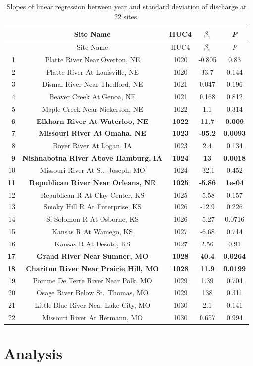\documentclass[12pt,]{article}
\begin{document}
\begin{longtable}[]{@{}rcccc@{}}
\caption{\label{tab:vartab} Slopes of linear regression between year and
standard deviation of discharge at 22 sites.}\tabularnewline
\toprule
~ & Site Name & HUC4 & \(\beta_1\) & \emph{P}\tabularnewline
\midrule
\endfirsthead
\toprule
~ & Site Name & HUC4 & \(\beta_1\) & \emph{P}\tabularnewline
\midrule
\endhead
1 & Platte River Near Overton, NE & 1020 & -0.805 & 0.83\tabularnewline
2 & Platte River At Louisville, NE & 1020 & 33.7 & 0.144\tabularnewline
3 & Dismal River Near Thedford, NE & 1021 & 0.047 & 0.196\tabularnewline
4 & Beaver Creek At Genoa, NE & 1021 & 0.168 & 0.812\tabularnewline
5 & Maple Creek Near Nickerson, NE & 1022 & 1.1 & 0.314\tabularnewline
\textbf{6} & \textbf{Elkhorn River At Waterloo, NE} & \textbf{1022} &
\textbf{11.7} & \textbf{0.009}\tabularnewline
\textbf{7} & \textbf{Missouri River At Omaha, NE} & \textbf{1023} &
\textbf{-95.2} & \textbf{0.0093}\tabularnewline
8 & Boyer River At Logan, IA & 1023 & 2.4 & 0.134\tabularnewline
\textbf{9} & \textbf{Nishnabotna River Above Hamburg, IA} &
\textbf{1024} & \textbf{13} & \textbf{0.0018}\tabularnewline
10 & Missouri River At St.~Joseph, MO & 1024 & -32.1 &
0.452\tabularnewline
\textbf{11} & \textbf{Republican River Near Orleans, NE} & \textbf{1025}
& \textbf{-5.86} & \textbf{1e-04}\tabularnewline
12 & Republican R At Clay Center, KS & 1025 & -5.58 &
0.157\tabularnewline
13 & Smoky Hill R At Enterprise, KS & 1026 & -12.9 &
0.226\tabularnewline
14 & Sf Solomon R At Osborne, KS & 1026 & -5.27 & 0.0716\tabularnewline
15 & Kansas R At Wamego, KS & 1027 & -6.68 & 0.714\tabularnewline
16 & Kansas R At Desoto, KS & 1027 & 2.56 & 0.91\tabularnewline
\textbf{17} & \textbf{Grand River Near Sumner, MO} & \textbf{1028} &
\textbf{40.4} & \textbf{0.0264}\tabularnewline
\textbf{18} & \textbf{Chariton River Near Prairie Hill, MO} &
\textbf{1028} & \textbf{11.9} & \textbf{0.0199}\tabularnewline
19 & Pomme De Terre River Near Polk, MO & 1029 & 1.39 &
0.704\tabularnewline
20 & Osage River Below St.~Thomas, MO & 1029 & 138 &
0.311\tabularnewline
21 & Little Blue River Near Lake City, MO & 1030 & 2.1 &
0.141\tabularnewline
22 & Missouri River At Hermann, MO & 1030 & 0.657 & 0.994\tabularnewline
\bottomrule
\end{longtable}

\hypertarget{analysis}{%
\section{Analysis}\label{analysis}}
\end{document}

